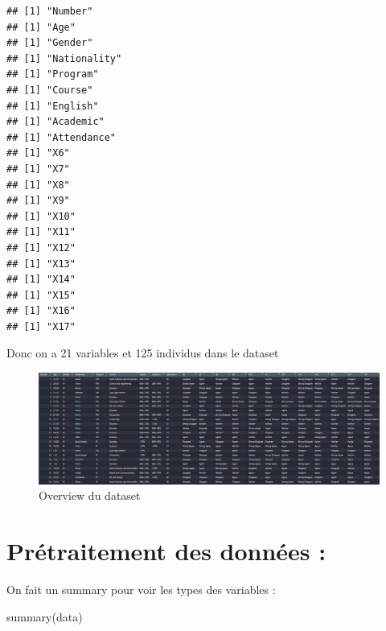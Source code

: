 \documentclass[
]{article}
\newenvironment{Shaded}{\begin{snugshade}}{\end{snugshade}}
\newcommand{\FunctionTok}[1]{\textcolor[rgb]{0.00,0.00,0.00}{#1}}
\newcommand{\NormalTok}[1]{#1}
\begin{document}
\begin{verbatim}
## [1] "Number"
## [1] "Age"
## [1] "Gender"
## [1] "Nationality"
## [1] "Program"
## [1] "Course"
## [1] "English"
## [1] "Academic"
## [1] "Attendance"
## [1] "X6"
## [1] "X7"
## [1] "X8"
## [1] "X9"
## [1] "X10"
## [1] "X11"
## [1] "X12"
## [1] "X13"
## [1] "X14"
## [1] "X15"
## [1] "X16"
## [1] "X17"
\end{verbatim}

Donc on a 21 variables et 125 individus dans le dataset

\begin{figure}
\centering
\includegraphics{d.png}
\caption{Overview du dataset}
\end{figure}

\hypertarget{pruxe9traitement-des-donnuxe9es}{%
\section{Prétraitement des données
:}\label{pruxe9traitement-des-donnuxe9es}}

On fait un summary pour voir les types des variables :

\begin{Shaded}
\begin{Highlighting}[]
\FunctionTok{summary}\NormalTok{(data)}
\end{Highlighting}
\end{Shaded}
\end{document}
